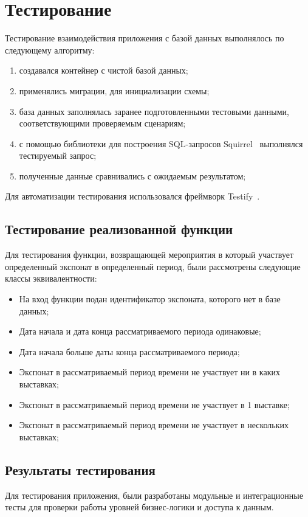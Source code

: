\section{Тестирование}

Тестирование взаимодействия приложения с базой данных выполнялось по следующему алгоритму:

\begin{enumerate}[label={\arabic*)}]
	\item создавался контейнер с чистой базой данных;
	\item применялись миграции, для инициализации схемы;
	\item база данных заполнялась заранее подготовленными тестовыми данными, соответствующими проверяемым сценариям;
	\item с помощью библиотеки для построения SQL-запросов Squirrel~\cite{squirrel} выполнялся тестируемый запрос;
	\item полученные данные сравнивались с ожидаемым результатом;
\end{enumerate}

Для автоматизации тестирования использовался фреймворк Testify~\cite{testify}.

\subsection{Тестирование реализованной функции}
Для тестирования функции, возвращающей мероприятия в который участвует определенный экспонат в определенный период, были рассмотрены следующие классы эквивалентности:
\begin{itemize}
	\item На вход функции подан идентификатор экспоната, которого нет в базе данных;
	\item Дата начала и дата конца рассматриваемого периода одинаковые;
	\item Дата начала больше даты конца рассматриваемого периода; 
	\item Экспонат в рассматриваемый период времени не участвует ни в каких выставках; 
	\item Экспонат в рассматриваемый период времени не участвует в 1 выставке; 
	\item Экспонат в рассматриваемый период времени не участвует в нескольких выставках; 
\end{itemize}


\subsection{Результаты тестирования}
Для тестирования приложения, были разработаны модульные и интеграционные тесты для проверки работы уровней бизнес-логики и доступа к данным.

